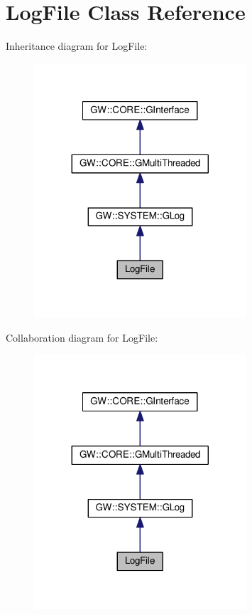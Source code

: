 \hypertarget{classLogFile}{}\section{Log\+File Class Reference}
\label{classLogFile}


Inheritance diagram for Log\+File\+:\nopagebreak
\begin{figure}[H]
\begin{center}
\leavevmode
\includegraphics[width=224pt]{classLogFile__inherit__graph}
\end{center}
\end{figure}


Collaboration diagram for Log\+File\+:\nopagebreak
\begin{figure}[H]
\begin{center}
\leavevmode
\includegraphics[width=224pt]{classLogFile__coll__graph}
\end{center}
\end{figure}

